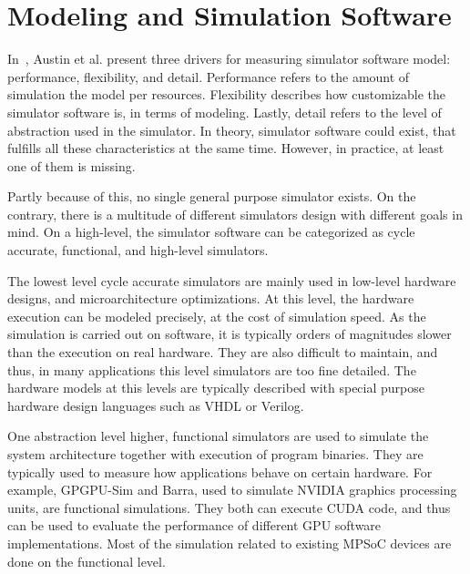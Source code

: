 \section{Modeling and Simulation Software}



In~\cite{Austin:2002:SimpleScalar}, Austin et al. present three drivers for measuring simulator software model: performance, flexibility, and detail. Performance refers to the amount of simulation the model per resources. Flexibility describes how customizable the simulator software is, in terms of modeling. Lastly, detail refers to the level of abstraction used in the simulator. In theory, simulator software could exist, that fulfills all these characteristics at the same time. However, in practice, at least one of them is missing.~\cite{Austin:2002:SimpleScalar}

Partly because of this, no single general purpose simulator exists. On the contrary, there is a multitude of different simulators design with different goals in mind. On a high-level, the simulator software can be categorized as cycle accurate, functional, and high-level simulators.

The lowest level cycle accurate simulators are mainly used in low-level hardware designs, and microarchitecture optimizations. At this level, the hardware execution can be modeled precisely, at the cost of simulation speed. As the simulation is carried out on software, it is typically orders of magnitudes slower than the execution on real hardware. They are also difficult to maintain, and thus, in many applications this level simulators are too fine detailed. The hardware models at this levels are typically described with special purpose hardware design languages such as VHDL or Verilog.~\cite{Patterson:2007:Computer, Weaver:2008:Cycle}

One abstraction level higher, functional simulators are used to simulate the system architecture together with execution of program binaries. They are typically used to measure how applications behave on certain hardware. For example, GPGPU-Sim and Barra, used to simulate NVIDIA graphics processing units, are functional simulations. They both can execute CUDA code, and thus can be used to evaluate the performance of different GPU software implementations. Most of the simulation related to existing MPSoC devices are done on the functional level.~\cite{Lopez:2015:GPGPUSIM}

